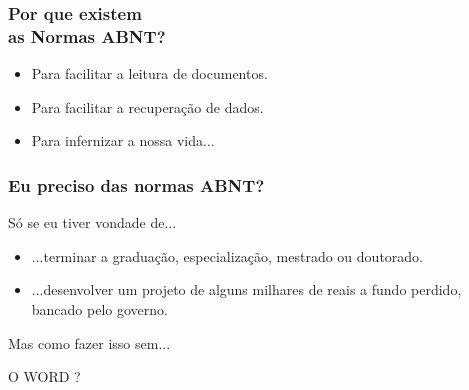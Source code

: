 \documentclass[aspectratio=43,14pt]{beamer}
\begin{document}
\begin{frame}
    \frametitle{Por que existem \\ as Normas ABNT?}
    \begin{itemize}
        \item{Para facilitar a leitura de documentos.}
        \item{Para facilitar a recuperação de dados.}
        \item{Para infernizar a nossa vida...}
    \end{itemize}
\end{frame}

\begin{frame}
    \frametitle{Eu preciso das normas ABNT?}
    Só se eu tiver vondade de...
    \begin{itemize}
        \item{...terminar a graduação, especialização, mestrado ou doutorado.}
        \item{...desenvolver um projeto de alguns milhares de reais a fundo perdido, bancado pelo governo.}
    \end{itemize}
    Mas como fazer isso sem...
\end{frame}

\begin{frame}
\begin{center}
\Huge O WORD ?
\end{center}
\end{frame}
\end{document}

